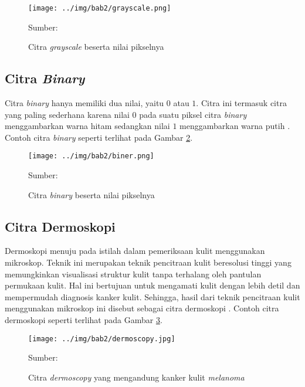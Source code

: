     \begin{figure}[H]
        \begin{center}
            \texttt{[image: ../img/bab2/grayscale.png]}
            \caption{Citra \textit{grayscale} beserta nilai pikselnya}
            \label{fig:grayscale}
            Sumber: \citep{Kusumanto2011}
        \end{center}
    \end{figure}

    \subsection{Citra \textit{Binary}}
    Citra \textit{binary} hanya memiliki dua nilai, yaitu $0$ atau $1$. Citra ini termasuk citra yang paling sederhana karena nilai $0$ pada suatu piksel citra \textit{binary} menggambarkan warna hitam sedangkan nilai $1$ menggambarkan warna putih \citep{Kusumanto2011}. Contoh citra \textit{binary} seperti terlihat pada Gambar \ref{fig:binary}.

    \begin{figure}[H]
        \begin{center}
            \texttt{[image: ../img/bab2/biner.png]}
            \caption{Citra \textit{binary} beserta nilai pikselnya}
            \label{fig:binary}
            Sumber: \citep{Kusumanto2011}
        \end{center}
    \end{figure}

    \subsection{Citra Dermoskopi}
    Dermoskopi menuju pada istilah dalam pemeriksaan kulit menggunakan mikroskop. Teknik ini merupakan teknik pencitraan kulit beresolusi tinggi yang memungkinkan visualisasi struktur kulit tanpa terhalang oleh pantulan permukaan kulit. Hal ini bertujuan untuk mengamati kulit dengan lebih detil dan mempermudah diagnosis kanker kulit. Sehingga, hasil dari teknik pencitraan kulit menggunakan mikroskop ini disebut sebagai citra dermoskopi \citep{Celebi2019}. Contoh citra dermoskopi seperti terlihat pada Gambar \ref{fig:dermoscopy}.

    \begin{figure}[H]
        \begin{center}
            \texttt{[image: ../img/bab2/dermoscopy.jpg]}
            \caption{Citra \textit{dermoscopy} yang mengandung kanker kulit \textit{melanoma}}
            \label{fig:dermoscopy}
            Sumber: \citep{Nersisson2021a}
        \end{center}
    \end{figure}

